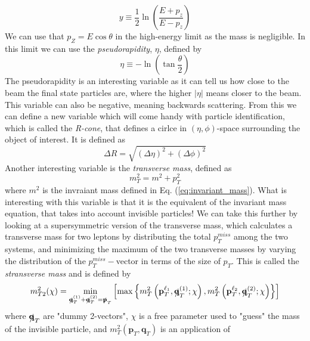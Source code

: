 \documentclass[14pt, a4paper]{book}
\begin{document}
\begin{equation}\label{eq:rapidity}
    y \equiv \frac{1}{2}\ln\left(\frac{E+p_z}{E-p_z}\right)  
\end{equation} 
We can use that $p_Z = E\cos\theta$ in the high-energy limit as the mass is negligible. In this limit we can use the \textit{pseudorapidity}, $\eta$, defined by
\begin{equation}\label{eq:pseudorapidity}
    \eta \equiv -\ln\left(\tan\frac{\theta}{2}\right)
\end{equation}
The pseudorapidity is an interesting variable as it can tell us how close to the beam the final state particles are, where the higher $\vert\eta\vert$ means closer to the beam. This variable can also be negative, meaning backwards scattering. 
From this we can define a new variable which will come handy with particle identification, which is called the \textit{R-cone}, that defines a cirlce in $(\eta,\phi)$-space surrounding the object of interest. It is defined as
\begin{equation}\label{eq:R-cone}
    \Delta R = \sqrt{(\Delta\eta)^2+(\Delta\phi)^2}
\end{equation}
Another interesting variable is the \textit{transverse mass}, defined as
\begin{equation}\label{eq:transverse_mass}
    m_T^2 = m^2 + p_T^2
\end{equation}
where $m^2$ is the invraiant mass defined in Eq. (\ref{eq:invariant_mass}). What is interesting with this variable is that it is the equivalent of the invariant mass equation, that takes into account invisible particles! 
We can take this further by looking at a supersymmetric version of the transverse mass, which calculates a transverse mass for two leptons by distributing the total $p_T^{miss}$ among the two systems, 
and minimizing the maximum of the two transverse masses by varying the distribution of the $p_T^{miss}-$vector in terms of the size of $p_T$. This is called the \textit{stransverse mass} and is defined by
\begin{equation}\label{eq:stransverse_mass}
    m_{T2}^2(\chi) = \underset{\slashed{\mathbf{q}}^{(1)}_T + \slashed{\mathbf{q}}^{(2)}_T = \slashed{\mathbf{p}}_T}{\min}
    \left[\max \left\{m_T^2\left(\mathbf{p}_T^{\ell_1}, \slashed{\mathbf{q}}^{(1)}_T;\chi\right), m_T^2\left(\mathbf{p}_T^{\ell_2}, \slashed{\mathbf{q}}^{(2)}_T;\chi\right) 
    \right\}\right] 
\end{equation}
where $\slashed{\mathbf{q}}_T$ are "dummy 2-vectors", $\chi$ is a free parameter used to "guess" the mass of the invisible particle, and $m_T^2\left(\mathbf{p}_T, \mathbf{q}_T\right)$ is an application of 
\end{document}
